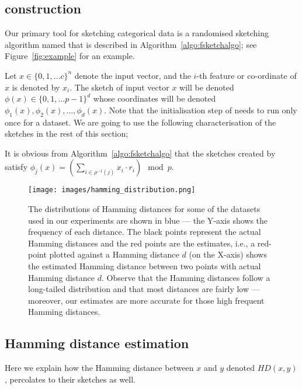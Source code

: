 \subsection{\fsketch construction}
Our primary tool for sketching categorical data is a randomised sketching algorithm named \fsketch that is described in Algorithm~\ref{algo:fsketchalgo}; see Figure~\ref{fig:example} for an example.

Let  $x \in \{0,1,\ldots c\}^n$ denote the input vector, and the $i$-th feature or co-ordinate of $x$ is denoted by $x_i$. The sketch of input vector $x$ will be denoted $\phi(x) \in \{0, 1, \ldots p-1\}^d$ whose coordinates will be denoted $\phi_1(x), \phi_2(x), \ldots, \phi_d(x)$. Note that the initialisation step of \fsketch needs to run only once for a dataset. We are going to use the following characterisation of the sketches in the rest of this section; 

\begin{obs}\label{obs:formula}
It is obvious from Algorithm~\ref{algo:fsketchalgo} that the sketches created by \fsketch satisfy $\phi_j(x) = (\sum_{i \in \rho^{-1}(j)} x_i \cdot r_i) \mod{p}$.
\end{obs}

\begin{figure*}
    \centering
    \texttt{[image: images/hamming\_distribution.png]}
    \caption{The distributions of Hamming distances for some of the datasets used in our experiments are shown in blue --- the Y-axis shows the frequency of each distance. The black points represent the actual Hamming distances and the red points are the estimates, i.e., a red-point plotted against a Hamming distance $d$ (on the X-axis) shows the estimated Hamming distance between two points with actual Hamming distance $d$. Observe that the Hamming distances follow a long-tailed distribution and that most distances are fairly low --- moreover, our estimates are more accurate for those high frequent Hamming distances.
    \label{fig:hamming_distance_distrib}}
\end{figure*}

\subsection{Hamming distance estimation}
Here we explain how the Hamming distance between $x$ and $y$ denoted $HD(x,y)$, percolates to their sketches as well. 

